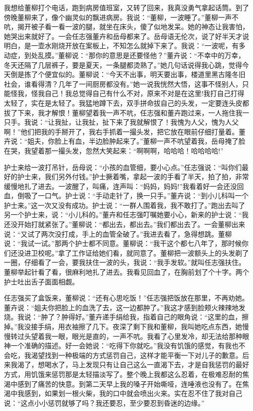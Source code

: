 \documentclass[12pt,oneside]{book}
\begin{document}
我想给董柳打个电话，跑到病房值班室，又转了回来，我真没勇气拿起话筒。到了傍晚董柳来了，像个幽灵似的飘进病房。我说：``董柳，一波睡了。''董柳一声不吭，揭开被子看一看一波的腿，就坐在床头，傻了似地发呆。她的神态让我害怕，她哭出来就好了。一会任志强董卉和岳母都来了。岳母语无伦次，说了好半天才说明白，是一壶水刚烧开放在案板上，不知怎么就掉下来了。我说：``一波呢，有多动症，到处乱摸。''董柳说：``那你的意思是还要怪他？''董卉说：``不幸中的万幸，冬天还隔了几层裤子，要是夏天，一条腿都烫熟了。''她几句话说得我心跳，觉得今天倒是拣了个便宜似的。董柳说：``今天不出事，明天要出事，楼道里黑古隆冬旧社会，谁看得清？几年了一间厨房都没有。''她一说我恍然大悟，这事不怪别人，只能怪我，怪我自己！我总觉得自己有什么不对，原来不对是在这里!我打自己打得太轻了，实在是太轻了。我猛地蹲下去，双手拼命拔自己的头发，一定要连头皮都拔了下来，我才解恨！董柳望着我一声不吭，任志强和董卉跑过来，一人拖住我一只手。我说：``让我扯，让我扯，扯下来了我就解恨了！我愧为人父，愧为人父啊！''他们把我的手掰开了，我右手抓着一撮头发，把它放在眼前仔细打量着。董卉说：``姐夫，你脸上有血，半边脸肿起来了。''董柳一声不吭望着我，岳母掩了脸在哭，我望着那一撮头发，忽然大笑起来：``啊啊啊，哈哈哈！哈哈哈哈!''

护士来给一波打吊针，岳母说：``小孩的血管细，要小心点。''任志强说：``叫你们最好的护士来，我们另外付钱。''护士撅着嘴，拿起一波的手看了半天，拍了拍，非常缓慢地扎了进去。一波醒了，叫痛，连声叫：``妈妈，妈妈!''我看着好一会还没回血，倒吸了一口气。护士说：``手动走针了，换一只手。''董卉说：``到小儿科叫一个护士来。''这一次又没有成功。护士说：``一群人围着我，我不敢打了。''跑出去叫了另一个护士来，说：``小儿科的。''董卉和任志强叮嘱她要小心，新来的护士说：``我还没开始打就紧张了。''董柳说：``都出去，都出去。''我们都出去了。一会董柳出来说：``又试了两次没打成，手上的血管全破了。''我进去看了，急得想跳。董柳说：``我试一试。''那两个护士都不同意。董柳说：``我干这个都七八年了，那时候你们还没进卫校呢。''拿了工作证给她们看，就同意了。董柳把一波额头上的头发剃了一圈，仔细看了一会，要我扶住一波的头，我说：``我手发软。''就叫任志强扶住。董柳举起针看了看，很麻利地扎了进去。我看见回血了，在胸前划了个十字。两个护士吐出舌子面面相觑。

任志强买了盒饭来，董柳说：``还有心思吃饭！''任志强把饭放在那里，不再劝她。董卉说：``姐夫你把脸上的血洗了去，这一边都肿了。''我这才感到脸颊火辣辣地发烧。我说：``肿了？肿得好。''董卉递手绢给我，指着自己的眼角说：``这里的血，擦掉。''我没接手绢，用衣袖擦了几下。夜深了剩下我和董柳，我叫她吃点东西，她慢慢转过头望着我一眼，眼光是直的，一声不吭。我看了心里发冷，却无法给那种眼神一个准确的描述。好一会她说：``吃得下你就吃。''我没有饥饿的感觉，有我也不会吃，我渴望找到一种极端的方式惩罚自己，这样才能平衡一下对儿子的歉意。后来我渴了，想喝水了，马上发现只有让自己这么一直渴下去，才是自我惩罚的最好方式，用饥饿来惩罚那是太轻描淡写了。整个晚上我都这么忍着，在极难忍耐的焦渴中感到了痛苦的快意。到第二天早上我的嗓子开始嘶哑，连唾液也没有了。在焦渴中我感到，如果划一根火柴，我的口中就会喷出火来。实在忍不住了我对自己说：``这点小小惩罚就够了吗？我还要忍，至少要忍到昏迷的边缘。''
\end{document}
